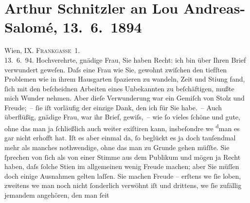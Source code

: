 

         
         \newcommand{\erwaehntePersonen}{Personen: Lou Andreas-Salomé, Georg Brandes, Paul Goldmann}
         \newcommand{\erwaehnteOrte}{Orte: Frankgasse, Paris, Wien}
         \newcommand{\erwaehnteWerke}{Werke: Anatol, Das Märchen. Schauspiel in drei Aufzügen}
               \section[Arthur Schnitzler an Lou Andreas-Salomé, 13. 6. 1894]{ Arthur Schnitzler an Lou Andreas-Salomé, 13. 6. 1894}\nopagebreak{}\rehead{ }\begin{ledgroupsized}[t]{13cm}\normalsize\beginnumbering \toendnotes[C]{\smallbreak\pagebreak[2]} 
\toendnotes[C]{\smallbreak}\pstart
           \raggedleft{}{\pb}Wien, IX. \textsc{Frankgasse 1}.{\\}13. 6. 94.\pend
           \pstart{}Hochverehrte, gnädige Frau,\pend\pstart
           Sie haben Recht: ich bin über Ihren Brief verwundert geweſen. Daſs eine Frau wie Sie,
               gewohnt zwiſchen den tiefſten Problemen wie in ihrem Hausgarten ſpazieren zu wandeln,
               Zeit und Sti{\geminationm}ung fand, ſich mit den beſcheidnen Arbeiten
               eines Unbekannten zu beſchäftigen, mußte mich Wunder nehmen. Aber dieſe Verwunderung
                  {\pb}war ein Gemiſch von Stolz und Freude; – ſie iſt vorläufig der einzige
               Dank, den ich für Sie habe. – Auch überflüßig, gnädige Frau, war ihr Brief, gewiſs, –
               wie ſo vieles ſchöne und gute, ohne das man ja ſchließlich auch weiter exiſtiren
               kann, insbeſondre we{\geminationn}{ }\substVorne{}\textsuperscript{d}\substDazwischen{}m\substHinten{}an es gar nicht erhofft hat. Iſt es aber einmal da, ſo beglückt es ja doch
               tauſendmal mehr als manches noth{\pb}wendige, ohne das man zu Grunde gehen
               müſſte. Sie ſprechen von ſich als von einer Stimme aus dem Publikum und mögen ja
               Recht haben, daſs ſolche Sti{\geminationm}en im allgemeinen wenig
               Freude machen; aber Sie müſſen doch einige Ausnahmen gelten laſſen. Sie machen Freude
               – erſtens we{\geminationn}{ }ſie loben, zweitens we{\geminationn}{ }{\pb}man noch nicht ſonderlich verwöhnt iſt und drittens, we{\geminationn}{ }ſie zufällig jemandem angehören, den man ſeit

\end{ledgroupsized}
